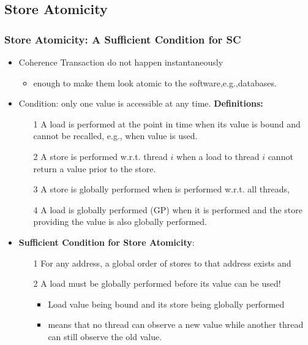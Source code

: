 \documentclass{beamer}
\renewcommand{\emph}[1]{\textcolor{structure}{#1}}
\newcommand{\emp}[1]{\textcolor{DikuRed}{ #1}}
\begin{document}
\subsection{Store Atomicity}

\begin{frame}[fragile,t]
\frametitle{Store Atomicity: A Sufficient Condition for SC}

\begin{itemize}
    \item Coherence Transaction do not happen instantaneously
    \begin{itemize}
        \item enough to make them look atomic to the software,e.g.,databases.
    \end{itemize}\medskip

    \item Condition: only one value is accessible at any time. {\bf Definitions:}
    \begin{itemize}
        \item[1] \emp{A load is performed} at the point in time when 
                    its value is bound and cannot be recalled, e.g., when value is used.
        \item[2] \emp{A store is performed w.r.t. thread $i$} when a load 
                    to thread $i$ cannot return a value prior to the store.
        \item[3] \emp{A store is globally performed} when is performed 
                    w.r.t. all threads,
        \item[4] \emp{A load is globally performed (GP)} when it is performed and 
                    the store providing the value is also globally performed. 
    \end{itemize}\medskip
    \item \emph{{\bf Sufficient Condition for Store Atomicity}:}\pause
    \begin{itemize}
        \item[1] For any address, a global order of stores to that address exists \alert{and}
        \item[2] A load must be globally performed before its value can be used!\medskip
        \begin{itemize}
            \item Load value being bound and its store being globally performed 
            \item means that no thread can observe a new value while another thread
                    can still observe the old value.
        \end{itemize}

    \end{itemize}
\end{itemize}

\end{frame}
\end{document}
